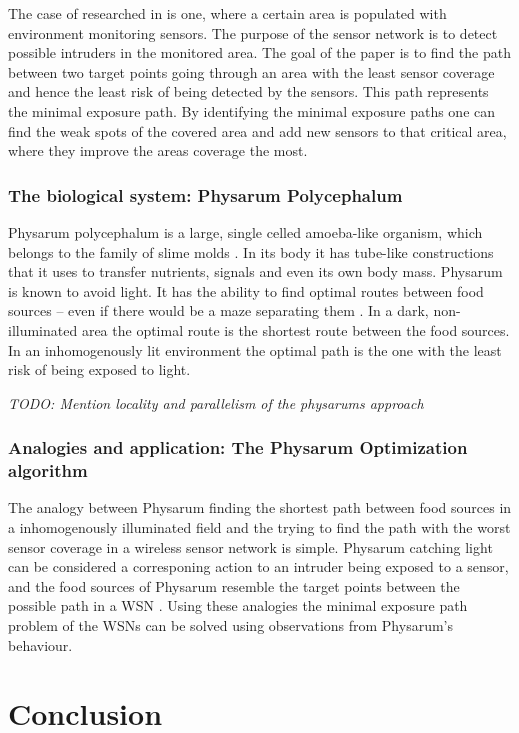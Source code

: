 \documentclass{IWORK2014}
\begin{document}
The case of researched in \cite{liu2012physarum} is one, where a certain area is populated with environment monitoring sensors. The purpose of the sensor network is to detect possible intruders in the monitored area. The goal of the paper is to find the path between two target points going through an area with the least sensor coverage and hence the least risk of being detected by the sensors. This path represents the minimal exposure path. By identifying the minimal exposure paths one can find the weak spots of the covered area and add new sensors to that critical area, where they improve the areas coverage the most.

\subsubsection{The biological system: Physarum Polycephalum}
Physarum polycephalum is a large, single celled amoeba-like organism, which belongs to the family of slime molds \cite{liu2012physarum}. In its body it has tube-like constructions that it uses to transfer nutrients, signals and even its own body mass. Physarum is known to avoid light. It has the ability to find optimal routes between food sources -- even if there would be a maze separating them \cite{nakagaki2000intelligence}. In a dark, non-illuminated area the optimal route is the shortest route between the food sources. In an inhomogenously lit environment the optimal path is the one with the least risk of being exposed to light.

\textit{TODO: Mention locality and parallelism of the physarums approach}
\subsubsection{Analogies and application: The Physarum Optimization algorithm}
The analogy between Physarum finding the shortest path between food sources in a inhomogenously illuminated field and the trying to find the path with the worst sensor coverage in a wireless sensor network is simple. Physarum catching light can be considered a corresponing action to an intruder being exposed to a sensor, and the food sources of Physarum resemble the target points between the possible path in a WSN \cite{liu2012physarum}. Using these analogies the minimal exposure path problem of the WSNs can be solved using observations from Physarum's behaviour.

\section{Conclusion}
\end{document}
